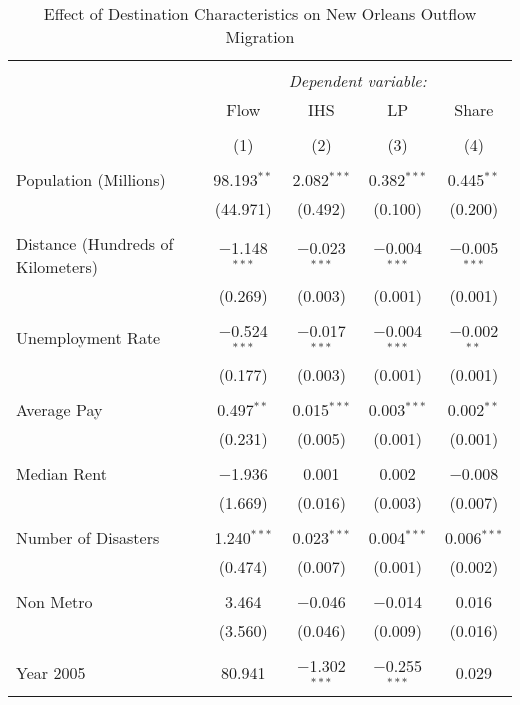 \documentclass[]{article}
\begin{document}
\begin{table}[!htbp] \centering 
  \caption{\label{reg:regmain}Effect of Destination Characteristics on New Orleans Outflow Migration} 
  \label{} 
\scriptsize 
\begin{tabular}{@{\extracolsep{5pt}}lcccc} 
\\[-1.8ex]\hline 
\hline \\[-1.8ex] 
 & \multicolumn{4}{c}{\textit{Dependent variable:}} \\ 
\cline{2-5} 
 & Flow & IHS & LP & Share \\ 
\\[-1.8ex] & (1) & (2) & (3) & (4)\\ 
\hline \\[-1.8ex] 
 Population (Millions) & 98.193$^{**}$ & 2.082$^{***}$ & 0.382$^{***}$ & 0.445$^{**}$ \\ 
  & (44.971) & (0.492) & (0.100) & (0.200) \\ 
  & & & & \\ 
 Distance (Hundreds of Kilometers) & $-$1.148$^{***}$ & $-$0.023$^{***}$ & $-$0.004$^{***}$ & $-$0.005$^{***}$ \\ 
  & (0.269) & (0.003) & (0.001) & (0.001) \\ 
  & & & & \\ 
 Unemployment Rate & $-$0.524$^{***}$ & $-$0.017$^{***}$ & $-$0.004$^{***}$ & $-$0.002$^{**}$ \\ 
  & (0.177) & (0.003) & (0.001) & (0.001) \\ 
  & & & & \\ 
 Average Pay & 0.497$^{**}$ & 0.015$^{***}$ & 0.003$^{***}$ & 0.002$^{**}$ \\ 
  & (0.231) & (0.005) & (0.001) & (0.001) \\ 
  & & & & \\ 
 Median Rent & $-$1.936 & 0.001 & 0.002 & $-$0.008 \\ 
  & (1.669) & (0.016) & (0.003) & (0.007) \\ 
  & & & & \\ 
 Number of Disasters & 1.240$^{***}$ & 0.023$^{***}$ & 0.004$^{***}$ & 0.006$^{***}$ \\ 
  & (0.474) & (0.007) & (0.001) & (0.002) \\ 
  & & & & \\ 
 Non Metro & 3.464 & $-$0.046 & $-$0.014 & 0.016 \\ 
  & (3.560) & (0.046) & (0.009) & (0.016) \\ 
  & & & & \\ 
 Year 2005 & 80.941 & $-$1.302$^{***}$ & $-$0.255$^{***}$ & 0.029 \\ 

\end{tabular}
\end{table}
\end{document}
